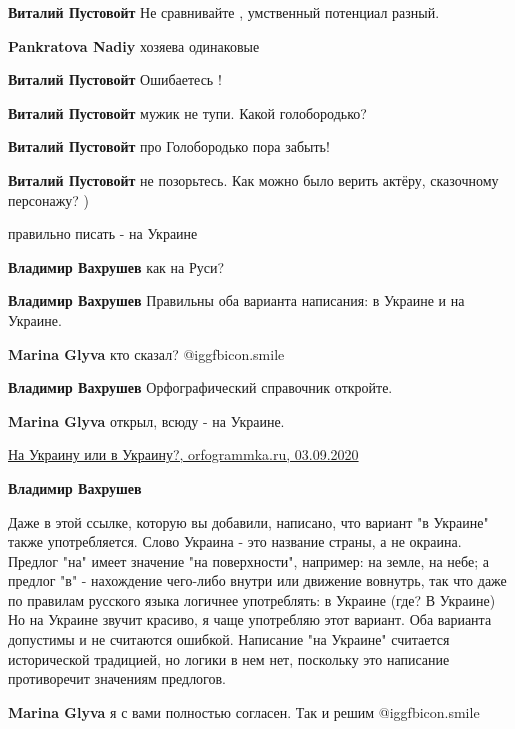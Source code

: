 \begin{itemize}
\begin{itemize} %
\textbf{Виталий Пустовойт} Не сравнивайте , умственный потенциал разный.

\textbf{Pankratova Nadiy} хозяева одинаковые

\textbf{Виталий Пустовойт} Ошибаетесь !

\textbf{Виталий Пустовойт} мужик не тупи. Какой голобородько?

\textbf{Виталий Пустовойт} про Голобородько пора забыть!

\textbf{Виталий Пустовойт} не позорьтесь. Как можно было верить актёру, сказочному персонажу? )
\end{itemize} %

правильно писать - на Украине

\begin{itemize} %
\textbf{Владимир Вахрушев} как на Руси?

\textbf{Владимир Вахрушев} Правильны оба варианта написания: в Украине и на Украине.

\textbf{Marina Glyva} кто сказал? @igg{fbicon.smile} 

\textbf{Владимир Вахрушев} Орфографический справочник откройте.

\textbf{Marina Glyva} открыл, всюду - на Украине.

\href{https://orfogrammka.ru/блог/интересное/на-украину-или-в-украину/}{%
На Украину или в Украину?, orfogrammka.ru, 03.09.2020%
}

\textbf{Владимир Вахрушев} 

Даже в этой ссылке, которую вы добавили, написано, что вариант "в Украине"
также употребляется. Слово Украина - это название страны, а не окраина. Предлог
"на" имеет значение "на поверхности", например: на земле, на небе; а предлог
"в" - нахождение чего-либо внутри или движение вовнутрь, так что даже по
правилам русского языка логичнее употреблять: в Украине (где? В Украине) Но на
Украине звучит красиво, я чаще употребляю этот вариант. Оба варианта допустимы
и не считаются ошибкой. Написание "на Украине" считается исторической
традицией, но логики в нем нет, поскольку это написание противоречит значениям
предлогов.

\textbf{Marina Glyva} я с вами полностью согласен. Так и решим @igg{fbicon.smile} 


\end{itemize}
\end{itemize}
